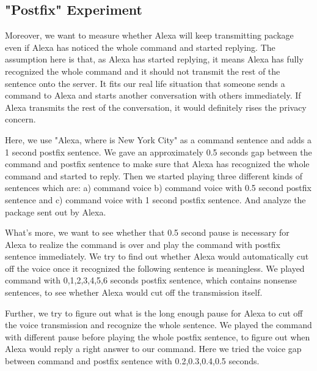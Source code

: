 \subsection{"Postfix" Experiment}
  
Moreover, we want to measure whether Alexa will keep transmitting package even if Alexa has noticed the whole command and started replying. The assumption here is that, as Alexa has started replying, it means Alexa has fully recognized the whole command and it should not transmit the rest of the sentence onto the server. It fits our real life situation that someone sends a command to Alexa and starts another conversation with others immediately. If Alexa transmits the rest of the conversation, it would definitely rises the privacy concern.

Here, we use "Alexa, where is New York City" as a command sentence and adds a 1 second postfix sentence. We gave an approximately 0.5 seconds gap between the command and postfix sentence to make sure that Alexa has recognized the whole command and started to reply. Then we started playing three different kinds of sentences which are: a) command voice b) command voice with 0.5 second postfix sentence and c) command voice with 1 second postfix sentence. And analyze the package sent out by Alexa.

What's more, we want to see whether that 0.5 second pause is necessary for Alexa to realize the command is over and play the command with postfix sentence immediately. We try to find out whether Alexa would automatically cut off the voice once it recognized the following sentence is meaningless. We played command with 0,1,2,3,4,5,6 seconds postfix sentence, which contains nonsense sentences, to see whether Alexa would cut off the transmission itself.

Further, we try to figure out what is the long enough pause for Alexa to cut off the voice transmission and recognize the whole sentence. We played the command with different pause before playing the whole postfix sentence, to figure out when Alexa would reply a right answer to our command. Here we tried the voice gap between command and postfix sentence with 0.2,0.3,0.4,0.5 seconds.


